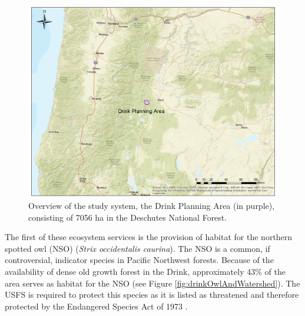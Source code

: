 \begin{figure}[ht]
\centering
\includegraphics[width=.85\textwidth]{../images/DrinkMap_Overview}
\caption[Overview of the study system, the Drink Planning Area]{Overview of the study system, the Drink Planning Area (in purple), consisting of 7056 ha in the Deschutes National Forest.}
\label{fig:drinkOverview}
\end{figure}

The first of these ecosystem services is the provision of habitat for the northern spotted owl (NSO) (\textit{Strix occidentalis caurina}). The NSO is a common, if controversial, indicator species in Pacific Northwest forests. Because of the availability of dense old growth forest in the Drink, approximately 43\% of the area serves as habitat for the NSO (see Figure \ref{fig:drinkOwlAndWatershed}). The USFS is required to protect this species as it is listed as threatened and therefore protected by the Endangered Species Act of 1973 \cite{congress1973endangered}.

